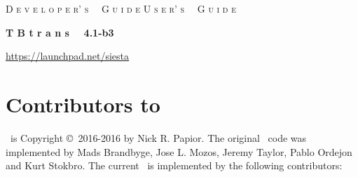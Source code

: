 %
%
%
%



\date{November 29, 2016}




\begin{titlepage}

\begin{center}

\vspace{1cm}
\ifdeveloper
 {\Huge \textsc{D e v e l o p e r' s \, \, G u i d e}}
\else
 {\Huge \textsc{U s e r' s \, \, G u i d e}}
\fi

\vspace{1cm}
\hrulefill
\vspace{1cm}

{\Huge \textbf{T B t r a n s \, \, 4.1-b3}}

\vspace{1cm}
\hrulefill
\vspace{0.5cm}

{\Large \printdate}

\vspace{1.5cm}
{\Large \url{https://launchpad.net/siesta}}

\end{center}

\end{titlepage}


\newpage

\section*{Contributors to \tbtrans}

\tbtrans\ is Copyright \copyright\ 2016-2016 by Nick R. Papior. The
original \tbtrans\ code was implemented by Mads Brandbyge, Jose
L. Mozos, Jeremy Taylor, Pablo Ordejon and Kurt Stokbro. The current
\tbtrans\ is implemented by the following contributors:

